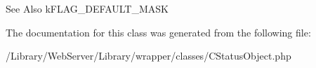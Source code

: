 \begin{DoxySeeAlso}{See Also}
k\-F\-L\-A\-G\-\_\-\-D\-E\-F\-A\-U\-L\-T\-\_\-\-M\-A\-S\-K 
\end{DoxySeeAlso}


The documentation for this class was generated from the following file\-:\begin{DoxyCompactItemize}
\item 
/\-Library/\-Web\-Server/\-Library/wrapper/classes/C\-Status\-Object.\-php\end{DoxyCompactItemize}
